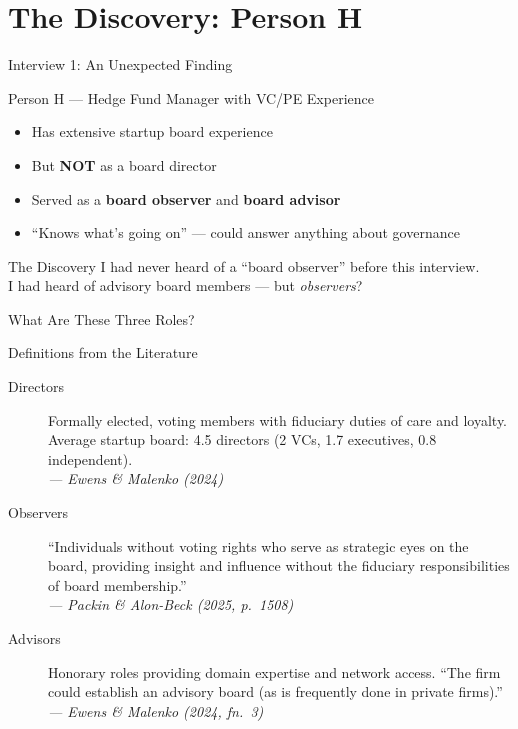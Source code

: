 \documentclass[aspectratio=169,12pt]{beamer}
\begin{document}
\section{The Discovery: Person H}

\begin{frame}{Interview 1: An Unexpected Finding}
\begin{block}{Person H --- Hedge Fund Manager with VC/PE Experience}
\begin{itemize}
\item Has extensive startup board experience
\item But \textbf{NOT} as a board director
\item Served as a \textbf{board observer} and \textbf{board advisor}
\item ``Knows what's going on'' --- could answer anything about governance
\end{itemize}
\end{block}
\vspace{0.5em}
\begin{alertblock}{The Discovery}
I had never heard of a ``board observer'' before this interview.\\
I had heard of advisory board members --- but \textit{observers}?
\end{alertblock}
\end{frame}

\begin{frame}{What Are These Three Roles?}
\small
\begin{block}{Definitions from the Literature}
\begin{description}
\item[\textcolor{harvardcrimson}{Directors}] Formally elected, voting members with fiduciary duties of care and loyalty. Average startup board: 4.5 directors (2 VCs, 1.7 executives, 0.8 independent). \\ \hfill\textit{\footnotesize --- Ewens \& Malenko (2024)}
\vspace{0.3em}
\item[\textcolor{accentblue}{Observers}] ``Individuals without voting rights who serve as strategic eyes on the board, providing insight and influence without the fiduciary responsibilities of board membership.'' \\ \hfill\textit{\footnotesize --- Packin \& Alon-Beck (2025, p.\ 1508)}
\vspace{0.3em}
\item[\textcolor{harvardgray}{Advisors}] Honorary roles providing domain expertise and network access. ``The firm could establish an advisory board (as is frequently done in private firms).'' \\ \hfill\textit{\footnotesize --- Ewens \& Malenko (2024, fn.\ 3)}
\end{description}
\end{block}
\end{frame}
\end{document}
